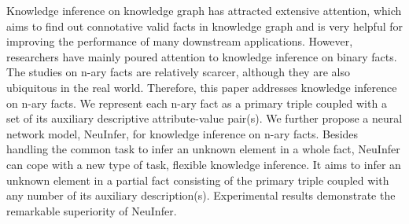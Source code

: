Knowledge inference on knowledge graph has attracted extensive attention, which aims to find out connotative valid facts in knowledge graph and is very helpful for improving the performance of many downstream applications. However, researchers have mainly poured attention to knowledge inference on binary facts. The studies on n-ary facts are relatively scarcer, although they are also ubiquitous in the real world. Therefore, this paper addresses knowledge inference on n-ary facts. We represent each n-ary fact as a primary triple coupled with a set of its auxiliary descriptive attribute-value pair(s). We further propose a neural network model, NeuInfer, for knowledge inference on n-ary facts. Besides handling the common task to infer an unknown element in a whole fact, NeuInfer can cope with a new type of task, flexible knowledge inference. It aims to infer an unknown element in a partial fact consisting of the primary triple coupled with any number of its auxiliary description(s). Experimental results demonstrate the remarkable superiority of NeuInfer.
